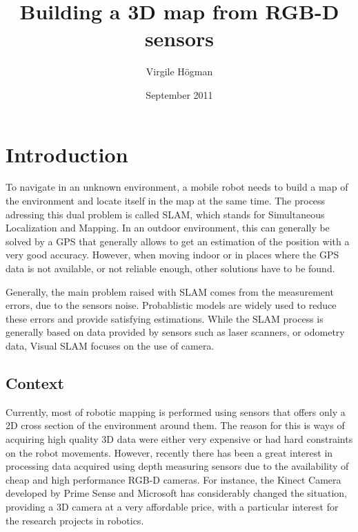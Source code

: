 \documentclass[a4paper,11pt]{kth-mag}
\title{Building a 3D map from RGB-D sensors}
\author{Virgile H\"{o}gman}
\date{September 2011}
\begin{document}
\frontmatter
\maketitle

\clearpage
{}
\clearpage
\tableofcontents
\mainmatter

\chapter{Introduction}

To navigate in an unknown environment, a mobile robot needs to build a map of the environment and locate itself in the map at the same time. The process adressing this dual problem is called SLAM, which stands for Simultaneous Localization and Mapping. In an outdoor environment, this can generally be solved by a GPS that generally allows to get an estimation of the position with a very good accuracy. However, when moving indoor or in places where the GPS data is not available, or not reliable enough, other solutions have to be found. 

Generally, the main problem raised with SLAM comes from the measurement errors, due to the sensors noise. Probablistic models are widely used to reduce these errors and provide satisfying estimations. While the SLAM process is generally based on data provided by sensors such as laser scanners, or odometry data, Visual SLAM focuses on the use of camera. 

\section{Context}

Currently, most of robotic mapping is performed using sensors that offers only a 2D cross section of the environment around them. The reason for this is ways of acquiring high quality 3D data were either very expensive or had hard constraints on the robot movements. However, recently there has been a great interest in processing data acquired using depth measuring sensors due to the availability of cheap and high performance RGB-D cameras. For instance, the Kinect Camera developed by Prime Sense and Microsoft has considerably changed the situation, providing a 3D camera at a very affordable price, with a particular interest for the research projects in robotics.
\end{document}
